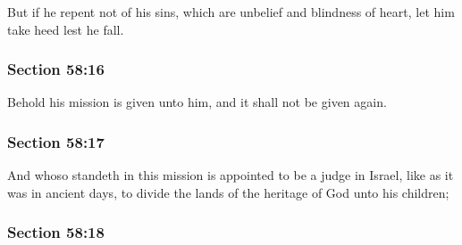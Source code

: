 		But if he repent not of his sins, which are unbelief and blindness of heart, let him take heed lest he fall.


	\subsubsection{Section 58:16} %
		\label{DC58-16}

		Behold his mission is given unto him, and it shall not be given again.


	\subsubsection{Section 58:17} %
		\label{DC58-17}

		And whoso standeth in this mission is appointed to be a judge in Israel, like as it was in ancient days, to divide the lands of the heritage of God unto his children;


	\subsubsection{Section 58:18} %
		\label{DC58-18}

